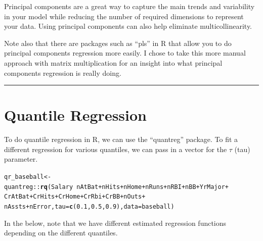 \documentclass{article}\usepackage[]{graphicx}\usepackage[]{color}
\makeatletter
\newcommand{\hlnum}[1]{\textcolor[rgb]{0.686,0.059,0.569}{#1}}%
\newcommand{\hlopt}[1]{\textcolor[rgb]{0,0,0}{#1}}%
\newcommand{\hlstd}[1]{\textcolor[rgb]{0.345,0.345,0.345}{#1}}%
\newcommand{\hlkwb}[1]{\textcolor[rgb]{0.69,0.353,0.396}{#1}}%
\newcommand{\hlkwc}[1]{\textcolor[rgb]{0.333,0.667,0.333}{#1}}%
\newcommand{\hlkwd}[1]{\textcolor[rgb]{0.737,0.353,0.396}{\textbf{#1}}}%
\newenvironment{kframe}{%
 \def\at@end@of@kframe{}%
 \ifinner\ifhmode%
  \def\at@end@of@kframe{\end{minipage}}%
  \begin{minipage}{\columnwidth}%
 \fi\fi%
 \def\FrameCommand##1{\hskip\@totalleftmargin \hskip-\fboxsep
 \colorbox{shadecolor}{##1}\hskip-\fboxsep
     \hskip-\linewidth \hskip-\@totalleftmargin \hskip\columnwidth}%
 \MakeFramed {\advance\hsize-\width
   \@totalleftmargin\z@ \linewidth\hsize
   \@setminipage}}%
 {\par\unskip\endMakeFramed%
 \at@end@of@kframe}
\newenvironment{knitrout}{}{} %
\makeatother
\begin{document}
Principal components are a great way to capture the main trends and variability in your model while reducing the number of required dimensions to represent your data. Using principal components can also help eliminate multicollinearity.

Note also that there are packages such as ``pls'' in R that allow you to do principal components regression more easily. I chose to take this more manual approach with matrix multiplication for an insight into what principal components regression is really doing.

\bigskip
\hrule
\bigskip

\section*{Quantile Regression}

To do quantile regression in R, we can use the ``quantreg'' package. To fit a different regression for various quantiles, we can pass in a vector for the $\tau$ (tau) parameter.

\begin{knitrout}
\color{fgcolor}\begin{kframe}
\begin{alltt}
\hlstd{qr_baseball} \hlkwb{<-} \hlstd{quantreg}\hlopt{::}\hlkwd{rq}\hlstd{(Salary} \hlopt{~} \hlstd{nAtBat} \hlopt{+} \hlstd{nHits} \hlopt{+} \hlstd{nHome} \hlopt{+} \hlstd{nRuns} \hlopt{+} \hlstd{nRBI} \hlopt{+} \hlstd{nBB} \hlopt{+} \hlstd{YrMajor} \hlopt{+}
                            \hlstd{CrAtBat} \hlopt{+} \hlstd{CrHits} \hlopt{+} \hlstd{CrHome} \hlopt{+} \hlstd{CrRbi} \hlopt{+} \hlstd{CrBB} \hlopt{+} \hlstd{nOuts} \hlopt{+}
                            \hlstd{nAssts} \hlopt{+} \hlstd{nError,} \hlkwc{tau} \hlstd{=} \hlkwd{c}\hlstd{(}\hlnum{0.1}\hlstd{,} \hlnum{0.5}\hlstd{,} \hlnum{0.9}\hlstd{),} \hlkwc{data} \hlstd{= baseball)}
\end{alltt}
\end{kframe}
\end{knitrout}

In the below, note that we have different estimated regression functions depending on the different quantiles.
\end{document}
